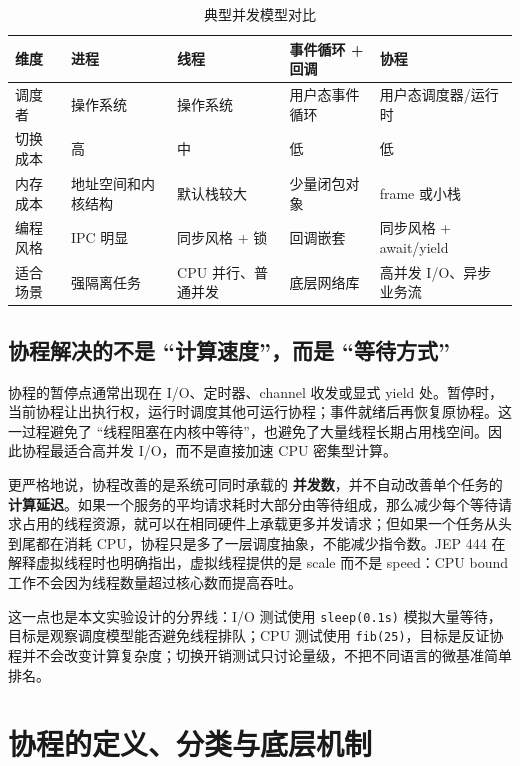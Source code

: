 \documentclass[UTF8,a4paper,12pt]{ctexart}
\begin{document}
\begin{table}[H]
  \centering
  \caption{典型并发模型对比}
  \begin{tabularx}{\textwidth}{lXXXX}
    \toprule
    维度 & 进程 & 线程 & 事件循环 + 回调 & 协程 \\
    \midrule
    调度者 & 操作系统 & 操作系统 & 用户态事件循环 & 用户态调度器/运行时 \\
    切换成本 & 高 & 中 & 低 & 低 \\
    内存成本 & 地址空间和内核结构 & 默认栈较大 & 少量闭包对象 & frame 或小栈 \\
    编程风格 & IPC 明显 & 同步风格 + 锁 & 回调嵌套 & 同步风格 + await/yield \\
    适合场景 & 强隔离任务 & CPU 并行、普通并发 & 底层网络库 & 高并发 I/O、异步业务流 \\
    \bottomrule
  \end{tabularx}
\end{table}

\subsection{协程解决的不是 ``计算速度''，而是 ``等待方式''}

协程的暂停点通常出现在 I/O、定时器、channel 收发或显式 yield 处。暂停时，当前协程让出执行权，运行时调度其他可运行协程；事件就绪后再恢复原协程。这一过程避免了 ``线程阻塞在内核中等待''，也避免了大量线程长期占用栈空间。因此协程最适合高并发 I/O，而不是直接加速 CPU 密集型计算。

更严格地说，协程改善的是系统可同时承载的 \textbf{并发数}，并不自动改善单个任务的 \textbf{计算延迟}。如果一个服务的平均请求耗时大部分由等待组成，那么减少每个等待请求占用的线程资源，就可以在相同硬件上承载更多并发请求；但如果一个任务从头到尾都在消耗 CPU，协程只是多了一层调度抽象，不能减少指令数。JEP 444 在解释虚拟线程时也明确指出，虚拟线程提供的是 scale 而不是 speed：CPU bound 工作不会因为线程数量超过核心数而提高吞吐\cite{jep444}。

这一点也是本文实验设计的分界线：I/O 测试使用 \verb|sleep(0.1s)| 模拟大量等待，目标是观察调度模型能否避免线程排队；CPU 测试使用 \verb|fib(25)|，目标是反证协程并不会改变计算复杂度；切换开销测试只讨论量级，不把不同语言的微基准简单排名。

\section{协程的定义、分类与底层机制}
\end{document}
